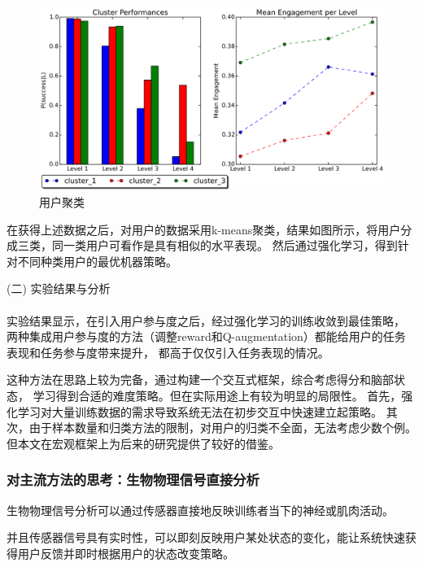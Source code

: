 \documentclass{article}
\begin{document}
            \begin{figure}[H]
            	
            	\centering
            	\includegraphics[scale=0.6]{images/user_model.png}
            	\caption{用户聚类\cite{ref17}}
            	\label{fig:label}
            \end{figure}
            在获得上述数据之后，对用户的数据采用k-means聚类，结果如图所示，将用户分成三类，同一类用户可看作是具有相似的水平表现。
            然后通过强化学习，得到针对不同种类用户的最优机器策略。

            (二) 实验结果与分析\paragraph{}
            实验结果显示，在引入用户参与度之后，经过强化学习的训练收敛到最佳策略，
            两种集成用户参与度的方法（调整reward和Q-augmentation）都能给用户的任务表现和任务参与度带来提升，
            都高于仅仅引入任务表现的情况。

            这种方法在思路上较为完备，通过构建一个交互式框架，综合考虑得分和脑部状态，
            学习得到合适的难度策略。但在实际用途上有较为明显的局限性。
            首先，强化学习对大量训练数据的需求导致系统无法在初步交互中快速建立起策略。
            其次，由于样本数量和归类方法的限制，对用户的归类不全面，无法考虑少数个例。
            但本文在宏观框架上为后来的研究提供了较好的借鉴。

            \subsubsection{对主流方法的思考：生物物理信号直接分析}
            生物物理信号分析可以通过传感器直接地反映训练者当下的神经或肌肉活动。

            并且传感器信号具有实时性，可以即刻反映用户某处状态的变化，能让系统快速获得用户反馈并即时根据用户的状态改变策略。
\end{document}
